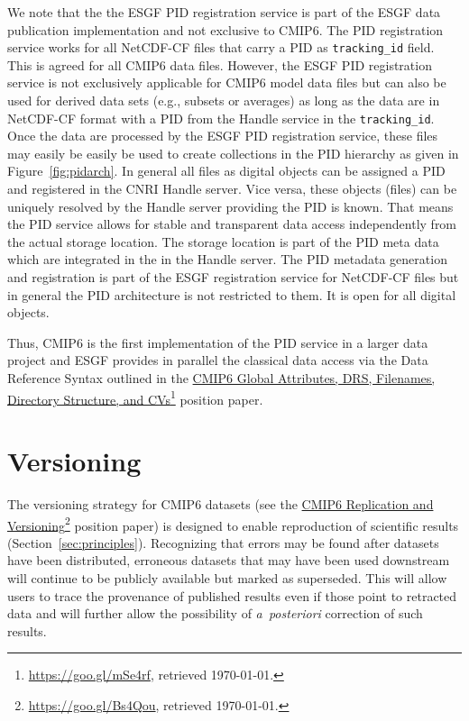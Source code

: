 \documentclass[gmd,manuscript]{copernicus}
\newcommand{\urlref}[2] {\href{#1}{#2}\footnote{\url{#1}, retrieved \today.}}
\begin{document}
We note that the the ESGF PID registration service is part of the ESGF
data publication implementation and not exclusive to CMIP6. The PID
registration service works for all NetCDF-CF files that carry a PID
as \texttt{tracking\_id} field. This is agreed for all CMIP6 data
files. However, the ESGF PID registration service is not exclusively
applicable for CMIP6 model data files but can also be used for derived data
sets (e.g., subsets or averages) as long as the data are in
NetCDF-CF format with a PID from the Handle service in the
\texttt{tracking\_id}. Once the data are processed by the ESGF PID
registration service, these files may easily be easily be used to
create collections in the PID hierarchy as given in
Figure~\ref{fig:pidarch}. In general all files as digital objects can
be assigned a PID and registered in the CNRI Handle server. Vice
versa, these objects (files) can be uniquely resolved by the Handle
server providing the PID is known. That means the PID service allows
for stable and transparent data access independently from the actual
storage location. The storage location is part of the PID meta data
which are integrated in the in the Handle server. The PID metadata
generation and registration is part of the ESGF registration service
for NetCDF-CF files but in general the PID architecture is not
restricted to them. It is open for all digital objects.

Thus, CMIP6 is the first implementation of the PID service in a larger
data project and ESGF provides in parallel the classical data access
via the Data Reference Syntax outlined in the
\urlref{https://goo.gl/mSe4rf}{CMIP6 Global Attributes, DRS,
  Filenames, Directory Structure, and CVs} position paper.

\section{Versioning}
\label{sec:version}

The versioning strategy for CMIP6 datasets (see the \urlref{https://goo.gl/Bs4Qou}{CMIP6
  Replication and Versioning} position paper) is designed to enable
reproduction of scientific results  (Section~\ref{sec:principles}).
Recognizing that errors may be found after datasets
have been distributed, erroneous datasets that may have been used
downstream will continue to be publicly available but marked as
superseded. This will allow users to trace the provenance of published
results even if those point to retracted data and will further allow the
possibility of \emph{a~posteriori} correction of such results.
\end{document}
